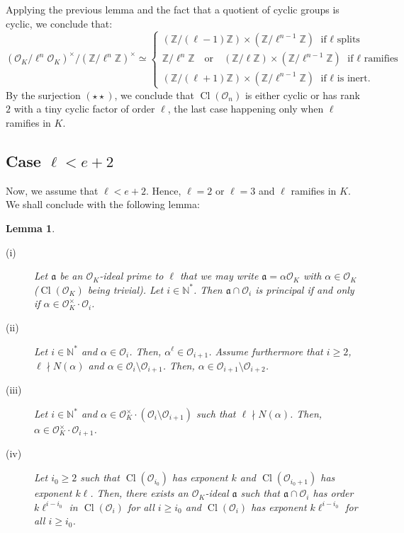 \documentclass[a4paper,10pt]{report}
\theoremstyle{definition}
\theoremstyle{plain}
\newtheorem{Lemma}[Definition]{Lemma}
\theoremstyle{definition}
\newcommand{\N}{\mathbb{N}}
\newcommand{\Z}{\mathbb{Z}}
\newcommand{\mO}{\mathcal{O}}
\renewcommand{\(}{\left(}
\renewcommand{\)}{\right)}
\newcommand{\mf}[1]{\mathfrak{#1}}
\DeclareMathOperator{\Cl}{Cl}
\begin{document}
Applying the previous lemma and the fact that a quotient of cyclic groups is cyclic, we conclude that:
\[(\mO_K/\ell^n\mO_K)^\times/(\Z/\ell^n\Z)^\times \simeq \left\{ \begin{array}{l} 
(\Z/(\ell-1)\Z)\times(\Z/\ell^{n-1}\Z) \mbox{ if $\ell$ splits}\\
\Z/\ell^{n}\Z \quad \mbox{or} \quad (\Z/\ell\Z)\times(\Z/\ell^{n-1}\Z) \mbox{ if $\ell$ ramifies}\\ 
(\Z/(\ell+1)\Z)\times(\Z/\ell^{n-1}\Z)  \mbox{ if $\ell$ is inert.}
\end{array}\right.\]
By the surjection $(\star\star)$, we conclude that $\Cl(\mO_n)$ is either cyclic or has rank $2$ with a tiny cyclic factor of order $\ell$, the last case happening only when $\ell$ ramifies in $K$.

\subsection{Case $\ell< e+2$}

Now, we assume that $\ell< e+2$. Hence, $\ell=2$ or $\ell=3$ and $\ell$ ramifies in $K$.  We shall conclude with the following lemma:

\begin{Lemma}\label{Lemma 18}

\begin{description}
\item[(i)] Let $\mf{a}$ be an $\mO_K$-ideal prime to $\ell$ that we may write $\mf{a}=\alpha\mO_K$ with $\alpha\in\mO_K$ ($\Cl(\mO_K)$ being trivial). Let $i\in\N^*$. Then $\mf{a}\cap\mO_i$ is principal if and only if $\alpha\in\mO_K^\times\cdot \mO_i$.

\item[(ii)] Let $i\in\N^*$ and $\alpha\in\mO_i$. Then, $\alpha^\ell\in\mO_{i+1}$. Assume furthermore that $i\geq 2$, $\ell\nmid N(\alpha)$ and $\alpha\in\mO_i\setminus\mO_{i+1}$. Then, $\alpha\in\mO_{i+1}\setminus\mO_{i+2}$.

\item[(iii)] Let $i\in\N^*$ and $\alpha\in \mO_K^\times\cdot(\mO_i\setminus\mO_{i+1})$ such that $\ell\nmid N(\alpha)$. Then, $\alpha\in\mO_K^\times\cdot\mO_{i+1}$.

\item[(iv)] Let $i_0\geq 2$ such that $\Cl(\mO_{i_0})$ has exponent $k$ and $\Cl(\mO_{i_0+1})$ has exponent $k\ell$. Then, there exists an $\mO_K$-ideal $\mf{a}$ such that $\mf{a}\cap\mO_i$ has order $k\ell^{i-i_0}$ in $\Cl(\mO_i)$ for all $i\geq i_0$ and $\Cl(\mO_i)$ has exponent $k\ell^{i-i_0}$ for all $i\geq i_0$.
\end{description}
\end{Lemma}
\end{document}
